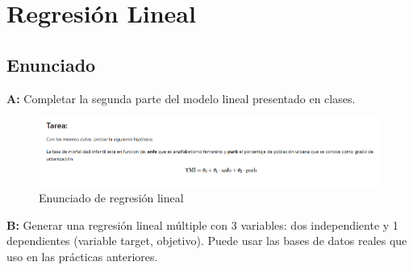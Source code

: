\newpage
\section{Regresión Lineal}
\subsection{Enunciado}
\textbf{A:} Completar la segunda parte del modelo lineal presentado en clases.
\begin{figure}[h!]
    \centering
    \includegraphics[width=1\textwidth]{images/statement.png}
    \caption{Enunciado de regresión lineal}
    \label{fig:regresion_lineal_statement}
\end{figure}

\textbf{B:} Generar una regresión lineal múltiple con 3 variables: dos  independiente y 1 dependientes (variable target, objetivo). Puede usar las bases de datos reales que uso en las prácticas anteriores.
